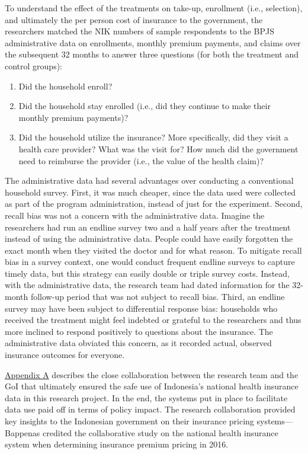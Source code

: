 To understand the effect of the treatments on take-up, enrollment (i.e., selection), and ultimately the per person cost of insurance to the government, the researchers matched the NIK numbers of sample respondents to the BPJS administrative data on enrollments, monthly premium payments, and claims over the subsequent 32 months to answer three questions (for both the treatment and control groups):

\begin{enumerate}
\def\labelenumi{\arabic{enumi}.}
\tightlist
\item
  Did the household enroll?
\item
  Did the household stay enrolled (i.e., did they continue to make their monthly premium payments)?
\item
  Did the household utilize the insurance? More specifically, did they visit a health care provider? What was the visit for? How much did the government need to reimburse the provider (i.e., the value of the health claim)?
\end{enumerate}

The administrative data had several advantages over conducting a conventional household survey. First, it was much cheaper, since the data used were collected as part of the program administration, instead of just for the experiment. Second, recall bias was not a concern with the administrative data. Imagine the researchers had run an endline survey two and a half years after the treatment instead of using the administrative data. People could have easily forgotten the exact month when they visited the doctor and for what reason. To mitigate recall bias in a survey context, one would conduct frequent endline surveys to capture timely data, but this strategy can easily double or triple survey costs. Instead, with the administrative data, the research team had dated information for the 32-month follow-up period that was not subject to recall bias. Third, an endline survey may have been subject to differential response bias: households who received the treatment might feel indebted or grateful to the researchers and thus more inclined to respond positively to questions about the insurance. The administrative data obviated this concern, as it recorded actual, observed insurance outcomes for everyone.

\protect\hyperlink{indonesia-appendixa}{Appendix A} describes the close collaboration between the research team and the GoI that ultimately ensured the safe use of Indonesia's national health insurance data in this research project. In the end, the systems put in place to facilitate data use paid off in terms of policy impact. The research collaboration provided key insights to the Indonesian government on their insurance pricing systems---Bappenas credited the collaborative study on the national health insurance system when determining insurance premium pricing in 2016.

